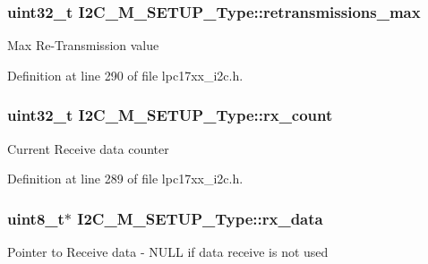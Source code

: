 \hypertarget{struct_i2_c___m___s_e_t_u_p___type_aa670cdabc0355d818afc15c788db63bc}{
\subsubsection[{retransmissions\-\_\-max}]{\setlength{\rightskip}{0pt plus 5cm}uint32\-\_\-t {\bf \-I2\-C\-\_\-\-M\-\_\-\-S\-E\-T\-U\-P\-\_\-\-Type\-::retransmissions\-\_\-max}}}\label{struct_i2_c___m___s_e_t_u_p___type_aa670cdabc0355d818afc15c788db63bc}
\-Max \-Re-\/\-Transmission value 

\-Definition at line 290 of file lpc17xx\-\_\-i2c.\-h.

\hypertarget{struct_i2_c___m___s_e_t_u_p___type_a64e0b05e44731d2c54ae082274db25d1}{
\subsubsection[{rx\-\_\-count}]{\setlength{\rightskip}{0pt plus 5cm}uint32\-\_\-t {\bf \-I2\-C\-\_\-\-M\-\_\-\-S\-E\-T\-U\-P\-\_\-\-Type\-::rx\-\_\-count}}}\label{struct_i2_c___m___s_e_t_u_p___type_a64e0b05e44731d2c54ae082274db25d1}
\-Current \-Receive data counter 

\-Definition at line 289 of file lpc17xx\-\_\-i2c.\-h.

\hypertarget{struct_i2_c___m___s_e_t_u_p___type_ad4ec2a23f5fb9d6896d8fb7549eb8a02}{
\subsubsection[{rx\-\_\-data}]{\setlength{\rightskip}{0pt plus 5cm}uint8\-\_\-t$\ast$ {\bf \-I2\-C\-\_\-\-M\-\_\-\-S\-E\-T\-U\-P\-\_\-\-Type\-::rx\-\_\-data}}}\label{struct_i2_c___m___s_e_t_u_p___type_ad4ec2a23f5fb9d6896d8fb7549eb8a02}
\-Pointer to \-Receive data -\/ \-N\-U\-L\-L if data receive is not used 

